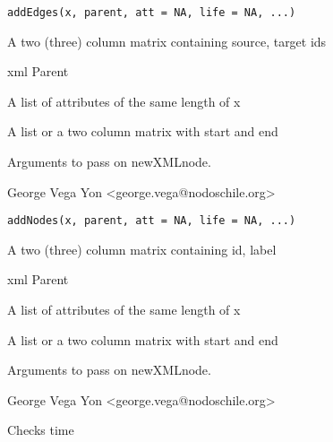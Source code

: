 \documentclass[letterpaper]{book}
\begin{document}
%
\begin{Usage}
\begin{verbatim}
addEdges(x, parent, att = NA, life = NA, ...)
\end{verbatim}
\end{Usage}
%
\begin{Arguments}
\begin{ldescription}
\item[\code{x}] A two (three) column matrix containing source, target ids
\item[\code{parent}] xml Parent
\item[\code{att}] A list of attributes of the same length of x
\item[\code{life}] A list or a two column matrix with start and end
\item[\code{...}] Arguments to pass on newXMLnode.
\end{ldescription}
\end{Arguments}
%
\begin{Author}\relax
George Vega Yon <george.vega@nodoschile.org>
\end{Author}
%
\begin{Usage}
\begin{verbatim}
addNodes(x, parent, att = NA, life = NA, ...)
\end{verbatim}
\end{Usage}
%
\begin{Arguments}
\begin{ldescription}
\item[\code{x}] A two (three) column matrix containing id, label
\item[\code{parent}] xml Parent
\item[\code{att}] A list of attributes of the same length of x
\item[\code{life}] A list or a two column matrix with start and end
\item[\code{...}] Arguments to pass on newXMLnode.
\end{ldescription}
\end{Arguments}
%
\begin{Author}\relax
George Vega Yon <george.vega@nodoschile.org>
\end{Author}
%
\begin{Description}\relax
Checks time
\end{Description}
\end{document}

